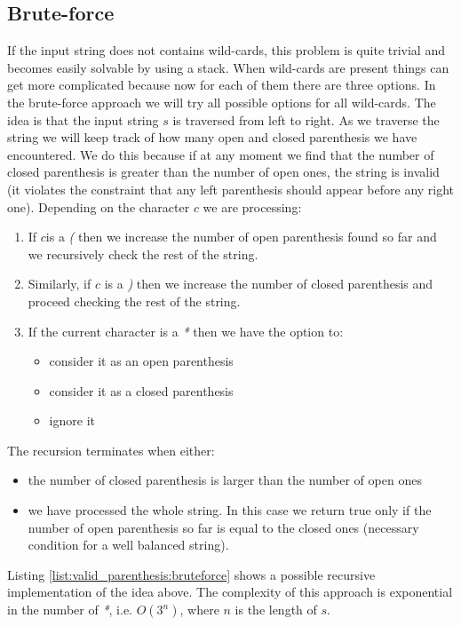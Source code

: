 \subsection{Brute-force}
\label{valid_parenthesis:sec:bruteforce}
If the input string does not contains  wild-cards, this problem is quite trivial and becomes easily solvable by using a stack. When wild-cards are present things can get more complicated because now for each of them there are three options. In the brute-force approach we will try all possible options for all wild-cards. 
The idea is that the input string $s$ is traversed from left to right. As we traverse the string we will keep track of how many open  and closed  parenthesis we have encountered. We do this because if at any moment we find that the number of closed parenthesis is greater than the number of open ones, the string is invalid (it violates the constraint that any left parenthesis should appear before any right one). Depending on the character $c$ we are processing:
\begin{enumerate}
	\item If $c$is a \textit{(} then we increase the number of open parenthesis found so far and we recursively check the rest of the string. 
	\item Similarly, if $c$ is a \textit{)} then we increase the number of closed parenthesis and proceed checking the rest of the string. 
	\item If the current character is a \textit{*} then we have the option to:
	\begin{itemize}
		\item consider it as an open parenthesis
		\item  consider it as a closed parenthesis
		\item ignore it
	\end{itemize}
\end{enumerate}

The recursion terminates when either:
 \begin{itemize}
	\item the number of closed parenthesis is larger than the number of open ones
	\item  we have processed the whole string. In this case we return true only if the number of open parenthesis so far is equal to the closed ones (necessary condition for a well balanced string).
\end{itemize}


Listing \ref{list:valid_parenthesis:bruteforce} shows a possible recursive implementation of the idea above. The complexity of this approach is exponential in the number of \textit{*}, i.e. $O(3^{n})$, where $n$ is the length of $s$.

